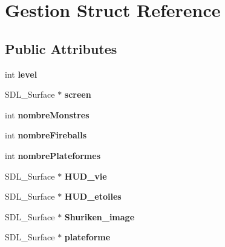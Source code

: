 \hypertarget{structGestion}{\section{Gestion Struct Reference}
\label{structGestion}
}
\subsection*{Public Attributes}
\begin{DoxyCompactItemize}
\item 
\hypertarget{structGestion_a45f8b7e530b177873fd774e5da2d1de5}{int {\bfseries level}}\label{structGestion_a45f8b7e530b177873fd774e5da2d1de5}

\item 
\hypertarget{structGestion_a6010de7d100c2fde67ca62ecae10c514}{S\-D\-L\-\_\-\-Surface $\ast$ {\bfseries screen}}\label{structGestion_a6010de7d100c2fde67ca62ecae10c514}

\item 
\hypertarget{structGestion_a0bae992eea21776812d1aedbc7978b1c}{int {\bfseries nombre\-Monstres}}\label{structGestion_a0bae992eea21776812d1aedbc7978b1c}

\item 
\hypertarget{structGestion_a4beff76b5f2e5ffb36a0ed73a6011561}{int {\bfseries nombre\-Fireballs}}\label{structGestion_a4beff76b5f2e5ffb36a0ed73a6011561}

\item 
\hypertarget{structGestion_a3179355e5cc371f25fb6005fee3ff4d4}{int {\bfseries nombre\-Plateformes}}\label{structGestion_a3179355e5cc371f25fb6005fee3ff4d4}

\item 
\hypertarget{structGestion_a42444aec400fb97154b1d2de18de3a34}{S\-D\-L\-\_\-\-Surface $\ast$ {\bfseries H\-U\-D\-\_\-vie}}\label{structGestion_a42444aec400fb97154b1d2de18de3a34}

\item 
\hypertarget{structGestion_ae1642eab04889a16e6b21ac714390fc7}{S\-D\-L\-\_\-\-Surface $\ast$ {\bfseries H\-U\-D\-\_\-etoiles}}\label{structGestion_ae1642eab04889a16e6b21ac714390fc7}

\item 
\hypertarget{structGestion_a7130e6c4139d9fab9d46215b2bd53f35}{S\-D\-L\-\_\-\-Surface $\ast$ {\bfseries Shuriken\-\_\-image}}\label{structGestion_a7130e6c4139d9fab9d46215b2bd53f35}

\item 
\hypertarget{structGestion_af1188a8f188b7b4ba638bbaccc6733e3}{S\-D\-L\-\_\-\-Surface $\ast$ {\bfseries plateforme}}\label{structGestion_af1188a8f188b7b4ba638bbaccc6733e3}


\end{DoxyCompactItemize}
